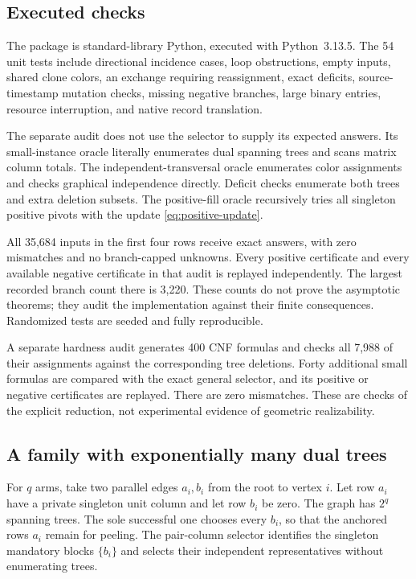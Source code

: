 \documentclass[11pt,letterpaper]{article}
\theoremstyle{definition}
\theoremstyle{remark}
\begin{document}
\subsection{Executed checks}
The package is standard-library Python, executed with Python~3.13.5. The 54 unit
tests include directional incidence cases, loop obstructions, empty inputs,
shared clone colors, an exchange requiring reassignment, exact deficits,
source-timestamp mutation checks, missing negative branches, large binary
entries, resource interruption, and native record translation.

The separate audit does not use the selector to supply its expected answers.
Its small-instance oracle literally enumerates dual spanning trees and scans
matrix column totals. The independent-transversal oracle enumerates color
assignments and checks graphical independence directly. Deficit checks enumerate
both trees and extra deletion subsets. The positive-fill oracle recursively tries
all singleton positive pivots with the update \eqref{eq:positive-update}.



All 35,684 inputs in the first four rows receive exact answers, with zero
mismatches and no branch-capped unknowns. Every positive certificate and every
available negative certificate in that audit is replayed independently. The
largest recorded branch count there is 3,220. These counts do not prove the
asymptotic theorems; they audit the implementation against their finite
consequences. Randomized tests are seeded and fully reproducible.

A separate hardness audit generates 400 CNF formulas and checks all 7,988 of
their assignments against the corresponding tree deletions. Forty additional
small formulas are compared with the exact general selector, and its positive
or negative certificates are replayed. There are zero mismatches. These are
checks of the explicit reduction, not experimental evidence of geometric
realizability.

\subsection{A family with exponentially many dual trees}
For $q$ arms, take two parallel edges $a_i,b_i$ from the root to vertex $i$.
Let row $a_i$ have a private singleton unit column and let row $b_i$ be zero.
The graph has $2^q$ spanning trees. The sole successful one chooses every $b_i$,
so that the anchored rows $a_i$ remain for peeling. The pair-column selector
identifies the singleton mandatory blocks $\{b_i\}$ and selects their
independent representatives without enumerating trees.
\end{document}
